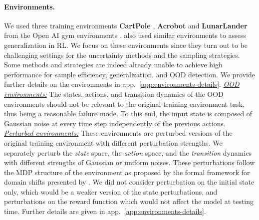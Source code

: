 \paragraph{Environments.} We used three training environments \textbf{CartPole} \citep{cartpole}, \textbf{Acrobot} \citep{acrobot1, acrobot2} and \textbf{LunarLander} \citep{lunarlander1} from the Open AI gym environments \citep{gym}. \citet{assessing-generalization-rl} also used similar environments to assess generalization in RL. We focus on these environments since they turn out to be challenging settings for the uncertainty methods and the sampling strategies. Some methods and strategies are indeed already unable to achieve high performance for sample efficiency, generalization, and OOD detection. We provide further details on the environments in app.~\ref{app:environments-details}. \textit{\underline{OOD environments:}} The states, actions, and transition dynamics of the OOD environments should not be relevant to the original training environment task, thus being a reasonable failure mode. To this end, the input state is composed of Gaussian noise at every time step independently of the previous actions. \textit{\underline{Perturbed environments:}} These environments are perturbed versions of the original training environment with different perturbation strengths. We separately perturb the \emph{state} space, the \emph{action} space, and the \emph{transition} dynamics with different strengths of Gaussian or uniform noises. These perturbations follow the MDP structure of the environment as proposed by the formal framework for domain shifts presented by \citet{domain-shifts-rl}. We did not consider perturbation on the initial state only, which would be a weaker version of the state perturbations, and perturbations on the reward function which would not affect the model at testing time. Further details are given in app.~\ref{app:environments-details}.

